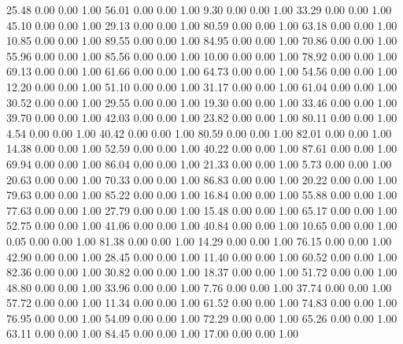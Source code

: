    25.48   0.00   0.00   1.00
   56.01   0.00   0.00   1.00
    9.30   0.00   0.00   1.00
   33.29   0.00   0.00   1.00
   45.10   0.00   0.00   1.00
   29.13   0.00   0.00   1.00
   80.59   0.00   0.00   1.00
   63.18   0.00   0.00   1.00
   10.85   0.00   0.00   1.00
   89.55   0.00   0.00   1.00
   84.95   0.00   0.00   1.00
   70.86   0.00   0.00   1.00
   55.96   0.00   0.00   1.00
   85.56   0.00   0.00   1.00
   10.00   0.00   0.00   1.00
   78.92   0.00   0.00   1.00
   69.13   0.00   0.00   1.00
   61.66   0.00   0.00   1.00
   64.73   0.00   0.00   1.00
   54.56   0.00   0.00   1.00
   12.20   0.00   0.00   1.00
   51.10   0.00   0.00   1.00
   31.17   0.00   0.00   1.00
   61.04   0.00   0.00   1.00
   30.52   0.00   0.00   1.00
   29.55   0.00   0.00   1.00
   19.30   0.00   0.00   1.00
   33.46   0.00   0.00   1.00
   39.70   0.00   0.00   1.00
   42.03   0.00   0.00   1.00
   23.82   0.00   0.00   1.00
   80.11   0.00   0.00   1.00
    4.54   0.00   0.00   1.00
   40.42   0.00   0.00   1.00
   80.59   0.00   0.00   1.00
   82.01   0.00   0.00   1.00
   14.38   0.00   0.00   1.00
   52.59   0.00   0.00   1.00
   40.22   0.00   0.00   1.00
   87.61   0.00   0.00   1.00
   69.94   0.00   0.00   1.00
   86.04   0.00   0.00   1.00
   21.33   0.00   0.00   1.00
    5.73   0.00   0.00   1.00
   20.63   0.00   0.00   1.00
   70.33   0.00   0.00   1.00
   86.83   0.00   0.00   1.00
   20.22   0.00   0.00   1.00
   79.63   0.00   0.00   1.00
   85.22   0.00   0.00   1.00
   16.84   0.00   0.00   1.00
   55.88   0.00   0.00   1.00
   77.63   0.00   0.00   1.00
   27.79   0.00   0.00   1.00
   15.48   0.00   0.00   1.00
   65.17   0.00   0.00   1.00
   52.75   0.00   0.00   1.00
   41.06   0.00   0.00   1.00
   40.84   0.00   0.00   1.00
   10.65   0.00   0.00   1.00
    0.05   0.00   0.00   1.00
   81.38   0.00   0.00   1.00
   14.29   0.00   0.00   1.00
   76.15   0.00   0.00   1.00
   42.90   0.00   0.00   1.00
   28.45   0.00   0.00   1.00
   11.40   0.00   0.00   1.00
   60.52   0.00   0.00   1.00
   82.36   0.00   0.00   1.00
   30.82   0.00   0.00   1.00
   18.37   0.00   0.00   1.00
   51.72   0.00   0.00   1.00
   48.80   0.00   0.00   1.00
   33.96   0.00   0.00   1.00
    7.76   0.00   0.00   1.00
   37.74   0.00   0.00   1.00
   57.72   0.00   0.00   1.00
   11.34   0.00   0.00   1.00
   61.52   0.00   0.00   1.00
   74.83   0.00   0.00   1.00
   76.95   0.00   0.00   1.00
   54.09   0.00   0.00   1.00
   72.29   0.00   0.00   1.00
   65.26   0.00   0.00   1.00
   63.11   0.00   0.00   1.00
   84.45   0.00   0.00   1.00
   17.00   0.00   0.00   1.00
